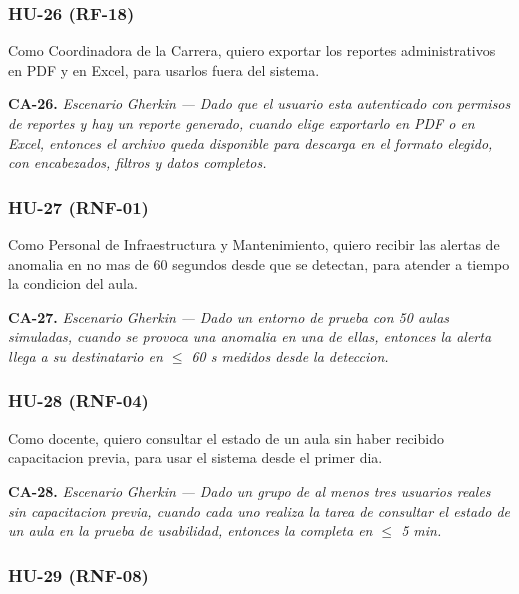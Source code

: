 \subsubsection*{HU-26 (RF-18)}


Como Coordinadora de la Carrera, quiero exportar los reportes administrativos en PDF y en Excel, para usarlos fuera del sistema.


\textbf{CA-26.} \textit{Escenario }\textit{Gherkin}\textit{ --- Dado que el usuario esta autenticado con permisos de reportes y hay un reporte generado, cuando elige exportarlo en PDF o en Excel, entonces el archivo queda disponible para descarga en el formato elegido, con encabezados, filtros y datos completos.}

\subsubsection*{HU-27 (RNF-01)}


Como Personal de Infraestructura y Mantenimiento, quiero recibir las alertas de anomalia en no mas de 60 segundos desde que se detectan, para atender a tiempo la condicion del aula.


\textbf{CA-27.} \textit{Escenario }\textit{Gherkin}\textit{ --- Dado un entorno de prueba con 50 aulas simuladas, cuando se provoca una anomalia en una de ellas, entonces la alerta llega a su destinatario en $\leq{}$ 60 s medidos desde la deteccion.}

\subsubsection*{HU-28 (RNF-04)}


Como docente, quiero consultar el estado de un aula sin haber recibido capacitacion previa, para usar el sistema desde el primer dia.


\textbf{CA-28.} \textit{Escenario }\textit{Gherkin}\textit{ --- Dado un grupo de al menos tres usuarios reales sin capacitacion previa, cuando cada uno realiza la tarea de consultar el estado de un aula en la prueba de usabilidad, entonces la completa en $\leq{}$ 5 min.}

\subsubsection*{HU-29 (RNF-08)}

